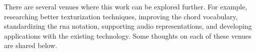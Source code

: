 
There are several venues where this work can be explored
further. For example, researching better texturization
techniques, improving the chord vocabulary, standardizing
the \gls{rna} notation, supporting audio representations,
and developing applications with the existing technology.
Some thoughts on each of these venues are shared below.
